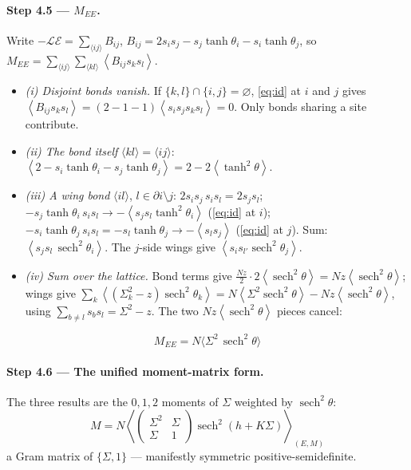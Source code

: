 \documentclass[11pt]{article}
\newcommand{\sech}{\operatorname{sech}}
\newcommand{\eq}{\mathcal{E}}
\newcommand{\LL}{\mathcal{L}}
\newcommand{\avg}[1]{\left\langle #1 \right\rangle}
\newcommand{\Sig}{\Sigma}
\begin{document}
\paragraph{Step 4.5 --- $M_{EE}$.}
Write $-\LL\eq=\sum_{\langle ij\rangle}B_{ij}$, $B_{ij}=2s_is_j-s_j\tanh\theta_i-s_i\tanh\theta_j$, so
$M_{EE}=\sum_{\langle ij\rangle}\sum_{\langle kl\rangle}\avg{B_{ij}s_ks_l}$.
\begin{itemize}[topsep=2pt,itemsep=1pt]
\item\emph{(i) Disjoint bonds vanish.} If $\{k,l\}\cap\{i,j\}=\varnothing$, \eqref{eq:id} at $i$ and
$j$ gives $\avg{B_{ij}s_ks_l}=(2-1-1)\avg{s_is_js_ks_l}=0$. Only bonds sharing a site contribute.
\item\emph{(ii) The bond itself} $\langle kl\rangle=\langle ij\rangle$:
$\avg{2-s_i\tanh\theta_i-s_j\tanh\theta_j}=2-2\avg{\tanh^2\theta}$.
\item\emph{(iii) A wing bond} $\langle il\rangle$, $l\in\partial i\setminus j$:
$2s_is_j\,s_is_l=2s_js_l$; $-s_j\tanh\theta_i\,s_is_l\to-\avg{s_js_l\tanh^2\theta_i}$ (\eqref{eq:id} at
$i$); $-s_i\tanh\theta_j\,s_is_l=-s_l\tanh\theta_j\to-\avg{s_ls_j}$ (\eqref{eq:id} at $j$). Sum:
$\avg{s_js_l\,\sech^2\theta_i}$. The $j$-side wings give $\avg{s_is_{l'}\sech^2\theta_j}$.
\item\emph{(iv) Sum over the lattice.} Bond terms give
$\tfrac{Nz}2\cdot2\avg{\sech^2\theta}=Nz\avg{\sech^2\theta}$; wings give
$\sum_k\avg{(\Sig_k^2-z)\sech^2\theta_k}=N\avg{\Sig^2\sech^2\theta}-Nz\avg{\sech^2\theta}$, using
$\sum_{b\ne l}s_bs_l=\Sig^2-z$. The two $Nz\avg{\sech^2\theta}$ pieces cancel:
\end{itemize}
\begin{equation}
\boxed{\;M_{EE}=N\big\langle\Sig^2\,\sech^2\theta\big\rangle\;}
\end{equation}

\paragraph{Step 4.6 --- The unified moment-matrix form.}
The three results are the $0,1,2$ moments of $\Sig$ weighted by $\sech^2\theta$:
\begin{equation}
\boxed{\;M=N\left\langle\begin{pmatrix}\Sig^2&\Sig\\\Sig&1\end{pmatrix}\sech^2(h+K\Sig)\right\rangle_{(E,M)}\;}
\tag{8}\label{eq:Mmat}
\end{equation}
a Gram matrix of $\{\Sig,1\}$ --- manifestly symmetric positive-semidefinite.
\end{document}
